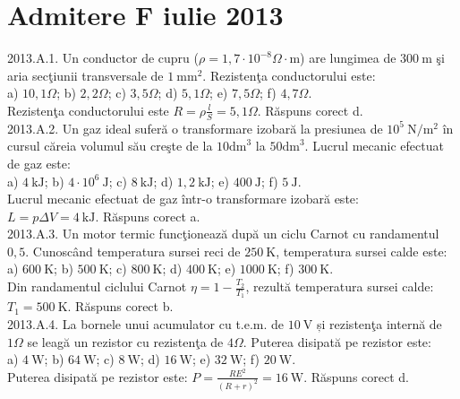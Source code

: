 \section{Admitere F iulie 2013}

2013.A.1. Un conductor de cupru ($\rho=1,7 \cdot 10^{-8} \Omega \cdot \mathrm{m}$) are lungimea de $300 \mathrm{~m}$ şi aria secţiunii transversale de $1 \mathrm{~mm}^{2}$. Rezistenţa conductorului este:\\ a) $10,1 \Omega$; b) $2,2 \Omega$; c) $3,5 \Omega$; d) $5,1 \Omega$; e) $7,5 \Omega$; f) $4,7 \Omega$.\\ Rezistenţa conductorului este $R=\rho \frac{l}{S}=5,1 \Omega$. Răspuns corect d.\\

2013.A.2. Un gaz ideal suferă o transformare izobară la presiunea de $10^{5} \mathrm{~N} / \mathrm{m}^{2}$ în cursul căreia volumul său creşte de la $10 \mathrm{dm}^{3}$ la $50 \mathrm{dm}^{3}$. Lucrul mecanic efectuat de gaz este:\\ a) $4 \mathrm{~kJ}$; b) $4 \cdot 10^{6} \mathrm{~J}$; c) $8 \mathrm{~kJ}$; d) $1,2 \mathrm{~kJ}$; e) $400 \mathrm{~J}$; f) $5 \mathrm{~J}$.\\ Lucrul mecanic efectuat de gaz într-o transformare izobară este:\\ $L=p \Delta V=4 \mathrm{~kJ}$. Răspuns corect a.\\

2013.A.3. Un motor termic funcţionează după un ciclu Carnot cu randamentul $0,5$. Cunoscând temperatura sursei reci de $250 \mathrm{~K}$, temperatura sursei calde este:\\ a) $600 \mathrm{~K}$; b) $500 \mathrm{~K}$; c) $800 \mathrm{~K}$; d) $400 \mathrm{~K}$; e) $1000 \mathrm{~K}$; f) $300 \mathrm{~K}$.\\ Din randamentul ciclului Carnot $\eta=1-\frac{T_{2}}{T_{1}}$, rezultă temperatura sursei calde:\\ $T_{1}=500 \mathrm{~K}$. Răspuns corect b.\\

2013.A.4. La bornele unui acumulator cu t.e.m. de $10 \mathrm{~V}$ și rezistenţa internă de $1 \Omega$ se leagă un rezistor cu rezistenţa de $4 \Omega$. Puterea disipată pe rezistor este:\\ a) $4 \mathrm{~W}$; b) $64 \mathrm{~W}$; c) $8 \mathrm{~W}$; d) $16 \mathrm{~W}$; e) $32 \mathrm{~W}$; f) $20 \mathrm{~W}$.\\ Puterea disipată pe rezistor este: $P=\frac{R E^{2}}{(R+r)^{2}}=16 \mathrm{~W}$. Răspuns corect d.\\

